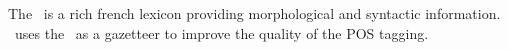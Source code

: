 \documentclass[manual-fr.tex]{subfiles}
\begin{document}
The \LeFFFFullCite\ is a rich french lexicon providing morphological and syntactic information. \SEM\ uses the \LeFFF\ as a gazetteer to improve the quality of the POS tagging.
\end{document}
